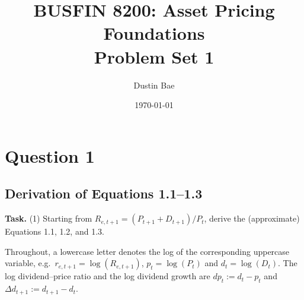 \documentclass[11pt]{article}
\title{BUSFIN 8200: Asset Pricing Foundations\\Problem Set 1}
\author{Dustin Bae}
\date{\today}
\makeatletter
\newcommand{\dpr}{\mathit{dp}}   %
\newcommand{\task}[1]{\par\if@nobreak\else\needspace{5\baselineskip}\fi\medskip\noindent
  \begin{minipage}{\linewidth}\textbf{Task.} #1\end{minipage}\par   %
  \nopagebreak\medskip\@afterheading}   %
\makeatother
\begin{document}
\maketitle

\section{Question 1}

\subsection{Derivation of Equations 1.1--1.3}

\task{(1) Starting from $R_{e,t+1} = (P_{t+1} + D_{t+1})/P_t$, derive the (approximate)
Equations 1.1, 1.2, and 1.3.}

Throughout, a lowercase letter denotes the log of the corresponding uppercase variable,
e.g.\ $r_{e,t+1} = \log(R_{e,t+1})$, $p_t = \log(P_t)$ and $d_t = \log(D_t)$. The log
dividend--price ratio and the log dividend growth are
$\dpr_t := d_t - p_t$ and $\Delta d_{t+1} := d_{t+1} - d_t$.
\end{document}
